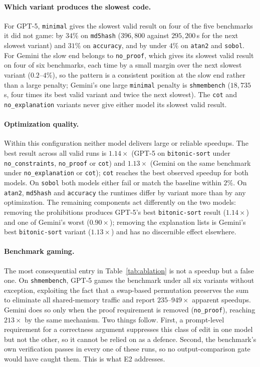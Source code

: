\paragraph{Which variant produces the slowest code.}
For GPT-5, \texttt{minimal} gives the slowest valid result on four of the five benchmarks it did not
game: by $34\%$ on \texttt{md5hash} ($396{,}800$ against $295{,}200$\,\textmu s for the next slowest
variant) and $31\%$ on \texttt{accuracy}, and by under $4\%$ on \texttt{atan2} and \texttt{sobol}. For
Gemini the slow end belongs to \texttt{no\_proof}, which gives its slowest valid result on four of six
benchmarks, each time by a small margin over the next slowest variant ($0.2$--$4\%$), so the pattern is
a consistent position at the slow end rather than a large penalty; Gemini's one large \texttt{minimal}
penalty is \texttt{shmembench} ($18{,}735$\,\textmu s, four times its best valid variant and twice the
next slowest). The \texttt{cot} and \texttt{no\_explanation} variants never give either model its
slowest valid result.

\paragraph{Optimization quality.}
Within this configuration neither model delivers large or reliable speedups. The best result across all
valid runs is $1.14\times$ (GPT-5 on \texttt{bitonic-sort} under \texttt{no\_constraints},
\texttt{no\_proof} or \texttt{cot}) and $1.13\times$ (Gemini on the same benchmark under
\texttt{no\_explanation} or \texttt{cot}); \texttt{cot} reaches the best observed speedup for both
models. On \texttt{sobol} both models either fail or match the baseline within $2\%$. On
\texttt{atan2}, \texttt{md5hash} and \texttt{accuracy} the runtimes differ by variant more than by any
optimization. The remaining components act differently on the two models: removing the prohibitions
produces GPT-5's best \texttt{bitonic-sort} result ($1.14\times$) and one of Gemini's worst
($0.90\times$); removing the explanation lists is Gemini's best \texttt{bitonic-sort} variant
($1.13\times$) and has no discernible effect elsewhere.

\paragraph{Benchmark gaming.}
\label{sec:gaming-obs}
The most consequential entry in Table~\ref{tab:ablation} is not a speedup but a false one. On
\texttt{shmembench}, GPT-5 games the benchmark under all six variants without exception, exploiting
the fact that a swap-based permutation preserves the sum to eliminate all shared-memory traffic and
report $235$--$949\times$ apparent speedups. Gemini does so only when the proof requirement is removed
(\texttt{no\_proof}), reaching $213\times$ by the same mechanism. Two things follow. First, a
prompt-level requirement for a correctness argument suppresses this class of edit in one model but not
the other, so it cannot be relied on as a defence. Second, the benchmark's own verification passes in
every one of these runs, so no output-comparison gate would have caught them. This is what E2
addresses.

